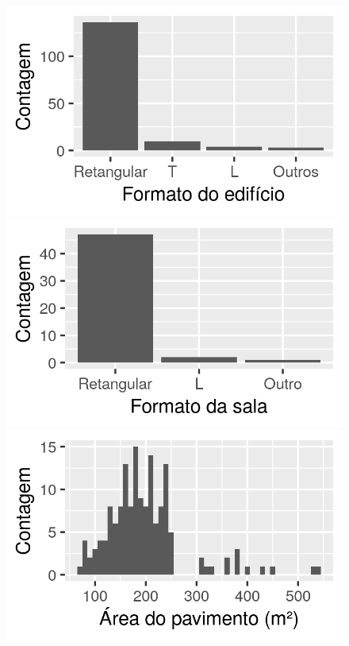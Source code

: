 \documentclass[brazil,hardcopy,openany,a4paper]{ufscthesis}
\begin{document}
\begin{figure}[H]
\begin{minipage}{.5\textwidth}
		\end{minipage}
		\centering
		\begin{minipage}{.5\textwidth}
			\centering
			\includegraphics[width=\linewidth]{img/hist_formato.png}
		\end{minipage}%
		\begin{minipage}{.5\textwidth}
			\centering
			\includegraphics[width=\linewidth]{img/hist_formato_sala.png}
		\end{minipage}
		\centering
		\begin{minipage}{.5\textwidth}
			\centering
			\includegraphics[width=\linewidth]{img/hist_area_edificio.png}

\end{minipage}
\end{figure}
\end{document}
